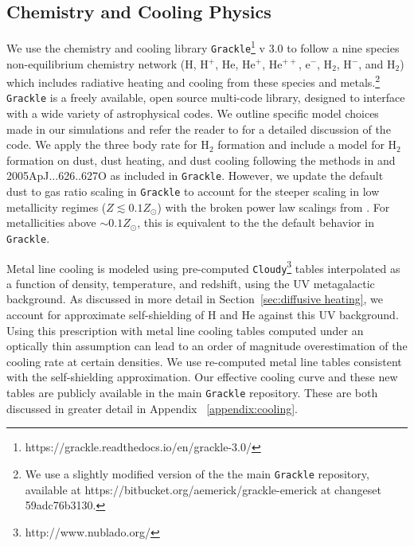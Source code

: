 \documentclass[twocolumn]{aastex61}
\begin{document}
\subsection{Chemistry and Cooling Physics}
\label{sec:chemistry}

We use the chemistry and cooling library \texttt{Grackle}\footnote{https://grackle.readthedocs.io/en/grackle-3.0/} v 3.0 to follow a nine species non-equilibrium chemistry network (H, H$^+$, He, He$^+$, He$^{++}$, e$^{-}$, H$_2$, H$^{-}$, and H$_{2}$) which includes radiative heating and cooling from these species and metals.\footnote{We use a slightly modified version of the the main \texttt{Grackle} repository, available at https://bitbucket.org/aemerick/grackle-emerick at changeset 59adc76b3130.} \texttt{Grackle} is a freely available, open source multi-code library, designed to interface with a wide variety of astrophysical codes. We outline specific model choices made in our simulations and refer the reader to \citep{GrackleMethod} for a detailed discussion of the code. We apply the \cite{Glover2008} three body rate for H$_{2}$ formation and include a model for H$_2$ formation on dust, dust heating, and dust cooling following the methods in \citet{2000ApJ...534..809O} and {2005ApJ...626..627O} as included in \texttt{Grackle}. However, we update the default dust to gas ratio scaling in \texttt{Grackle} to account for the steeper scaling in low metallicity regimes ($Z \lesssim 0.1 Z_{\odot}$) with the broken power law scalings from \cite{Remy-Ruyer2014}. For metallicities above $\sim 0.1 Z_{\odot}$, this is equivalent to the the default behavior in \texttt{Grackle}. 

Metal line cooling is modeled using pre-computed \texttt{Cloudy}\footnote{http://www.nublado.org/} tables interpolated as a function of density, temperature, and redshift, using the \cite{HM2012} UV metagalactic background. As discussed in more detail in Section~\ref{sec:diffusive heating}, we account for approximate self-shielding of H and He against this UV background. Using this prescription with metal line cooling tables computed under an optically thin assumption can lead to an order of magnitude overestimation of the cooling rate at certain densities. We use re-computed metal line tables consistent with the self-shielding approximation. Our effective cooling curve and these new tables are publicly available in the main \texttt{Grackle} repository. These are both discussed in greater detail in Appendix ~\ref{appendix:cooling}.
\end{document}

